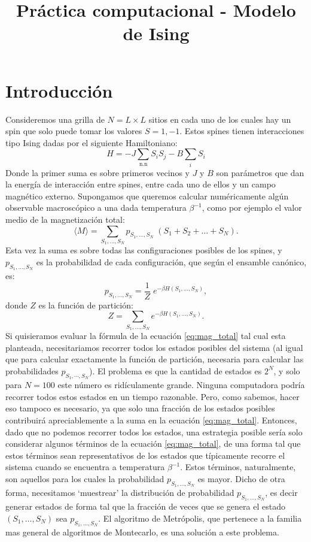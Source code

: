 \documentclass[a4paper,11pt,oneside]{article}
\title{Práctica computacional - Modelo de Ising}
\author{}
\date{}
\newcommand{\mean}[1]{\langle #1 \rangle}
\begin{document}
\maketitle

\section{Introducción}
Consideremos una grilla de $N = L\times L$ sitios en cada uno de los cuales hay
un spin que solo puede tomar los valores $S = 1,-1$. Estos
spines tienen interacciones tipo Ising dadas por el siguiente Hamiltoniano:
\begin{equation}
    H = -J\sum_\text{n.n} S_i S_j - B \sum_i S_i
\end{equation}
Donde la primer suma es sobre primeros vecinos y $J$ y $B$ son parámetros que
dan la energía de interacción entre spines, entre cada uno de ellos y un
campo magnético externo. Supongamos que queremos calcular numéricamente algún
observable macroscópico a una dada temperatura $\beta^{-1}$, como por ejemplo
el valor medio de la magnetización total:
\begin{equation}
    \mean{M} = \sum_{S_1,\dots,S_N} p_{S_1,\dots,S_N} \; (S_1+S_2+\dots+S_N).
    \label{eq:mag_total}
\end{equation}
Esta vez la suma es sobre todas las configuraciones posibles de los spines, y
$p_{S_1,\dots,S_N}$ es la probabilidad de cada configuración, que según el
ensamble canónico, es:
\begin{equation}
    p_{S_1,\dots,S_N} = \frac{1}{Z} \; e^{-\beta H(S_1,\dots,S_N)},
\end{equation}
donde $Z$ es la función de partición:
\begin{equation}
    Z = \sum_{S_1,\dots,S_N} e^{-\beta H(S_1,\dots,S_N)}.
\end{equation}
Si quisieramos evaluar la fórmula de la ecuación \ref{eq:mag_total} tal cual esta planteada,
necesitariamos recorrer todos los estados posibles del sistema (al igual que
para calcular exactamente la función de partición, necesaria para calcular las
probabilidades $p_{S_1,\cdots,S_N}$). El problema es que la cantidad de estados
es $2^{N}$, y solo para $N=100$ este número es ridículamente grande. Ninguna
computadora podría recorrer todos estos estados en un tiempo razonable. Pero,
como sabemos, hacer eso tampoco es necesario, ya que solo una fracción de los
estados posibles contribuirá apreciablemente a la suma en la ecuación
\ref{eq:mag_total}. Entonces, dado que no podemos recorrer todos los estados,
una estrategia posible sería solo considerar algunos términos de la ecuación
\ref{eq:mag_total}, de una forma tal que estos términos sean representativos
de los estados que típicamente recorre el sistema cuando se encuentra a
temperatura $\beta^{-1}$. Estos términos, naturalmente, son aquellos para los
cuales la probabilidad $p_{S_1,\dots,S_N}$ es mayor.
Dicho de otra forma, necesitamos `muestrear' la
distribución de probabilidad $p_{S_1,\dots,S_N}$, es decir generar estados de
forma tal que la fracción de veces que se genera el estado $(S_1,\dots,S_N)$
sea $p_{S_1,\dots,S_N}$. El algoritmo de Metrópolis, que pertenece a la familia
mas general de algoritmos de Montecarlo, es una solución a este problema.
\end{document}
